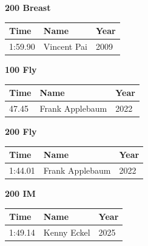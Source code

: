 \vspace{1.2em}
\noindent\begin{minipage}[t]{0.48\textwidth}
\centering
\textbf{\textcolor{teamprimary}{200 Breast}}\par
\vspace{0.5em}
\centering
\small
\renewcommand{\arraystretch}{1.0}
\setlength{\tabcolsep}{4pt}
\begin{tabular}{@{}p{1.8cm}p{3.0cm}p{1.0cm}@{}}
\toprule
\textbf{Time} & \textbf{Name} & \textbf{Year} \\
\midrule
1:59.90 & Vincent Pai & 2009 \\
\bottomrule
\end{tabular}
\end{minipage}
\hfill
\begin{minipage}[t]{0.48\textwidth}
\centering
\textbf{\textcolor{teamprimary}{100 Fly}}\par
\vspace{0.5em}
\centering
\small
\renewcommand{\arraystretch}{1.0}
\setlength{\tabcolsep}{4pt}
\begin{tabular}{@{}p{1.8cm}p{3.0cm}p{1.0cm}@{}}
\toprule
\textbf{Time} & \textbf{Name} & \textbf{Year} \\
\midrule
47.45 & Frank Applebaum & 2022 \\
\bottomrule
\end{tabular}
\end{minipage}
\vspace{1.2em}
\noindent\begin{minipage}[t]{0.48\textwidth}
\centering
\textbf{\textcolor{teamprimary}{200 Fly}}\par
\vspace{0.5em}
\centering
\small
\renewcommand{\arraystretch}{1.0}
\setlength{\tabcolsep}{4pt}
\begin{tabular}{@{}p{1.8cm}p{3.0cm}p{1.0cm}@{}}
\toprule
\textbf{Time} & \textbf{Name} & \textbf{Year} \\
\midrule
1:44.01 & Frank Applebaum & 2022 \\
\bottomrule
\end{tabular}
\end{minipage}
\hfill
\begin{minipage}[t]{0.48\textwidth}
\centering
\textbf{\textcolor{teamprimary}{200 IM}}\par
\vspace{0.5em}
\centering
\small
\renewcommand{\arraystretch}{1.0}
\setlength{\tabcolsep}{4pt}
\begin{tabular}{@{}p{1.8cm}p{3.0cm}p{1.0cm}@{}}
\toprule
\textbf{Time} & \textbf{Name} & \textbf{Year} \\
\midrule
1:49.14 & Kenny Eckel & 2025 \\
\bottomrule
\end{tabular}
\end{minipage}

